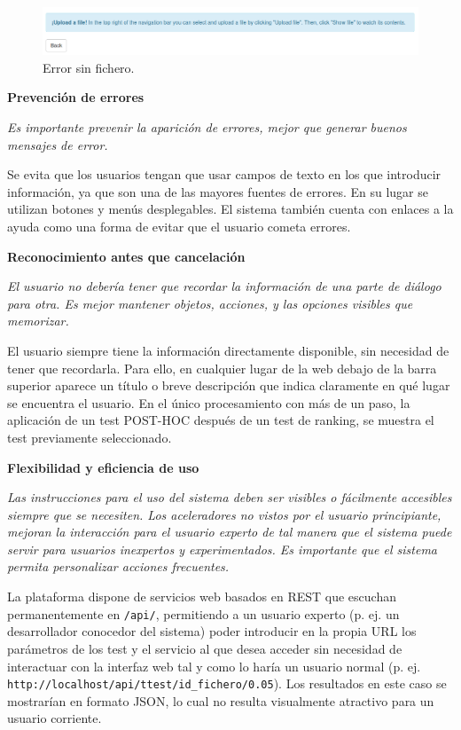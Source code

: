 \begin{figure}[H]
\centering
\includegraphics[scale=0.5]{figuras/nielsen_error.png}
\caption{Error sin fichero.}
\label{fig:nielsen_error}
\end{figure}

\noindent
\textbf{Prevención de errores}

\textit{Es importante prevenir la aparición de errores, mejor que generar buenos mensajes de error.}

Se evita que los usuarios tengan que usar campos de texto en los que introducir información, ya que son una de las mayores fuentes de errores. En su lugar se utilizan botones y menús desplegables. El sistema también cuenta con enlaces a la ayuda como una forma de evitar que el usuario cometa errores.

\noindent
\textbf{Reconocimiento antes que cancelación}

\textit{El usuario no debería tener que recordar la información de una parte de diálogo para otra. Es mejor mantener objetos, acciones, y las opciones visibles que memorizar.}

El usuario siempre tiene la información directamente disponible, sin necesidad de tener que recordarla. Para ello, en cualquier lugar de la web debajo de la barra superior aparece un título o breve descripción que indica claramente en qué lugar se encuentra el usuario. En el único procesamiento con más de un paso, la aplicación de un test POST-HOC después de un test de ranking, se muestra el test previamente seleccionado.

\noindent
\textbf{Flexibilidad y eficiencia de uso}

\textit{Las instrucciones para el uso del sistema deben ser visibles o fácilmente accesibles siempre que se necesiten. Los aceleradores no vistos por el usuario principiante, mejoran la interacción para el usuario experto de tal manera que el sistema puede servir para usuarios inexpertos y experimentados. Es importante que el sistema permita personalizar acciones frecuentes.}

La plataforma dispone de servicios web basados en REST que escuchan permanentemente en \texttt{/api/}, permitiendo a un usuario experto (p. ej. un desarrollador conocedor del sistema) poder introducir en la propia URL los parámetros de los test y el servicio al que desea acceder sin necesidad de interactuar con la interfaz web tal y como lo haría un usuario normal (p. ej. \texttt{http://localhost/api/ttest/id\_fichero/0.05}). Los resultados en este caso se mostrarían en formato JSON, lo cual no resulta visualmente atractivo para un usuario corriente.

